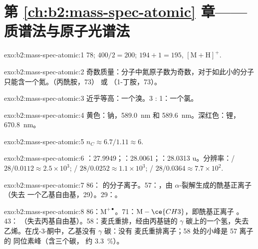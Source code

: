 \section*{第 \ref{ch:b2:mass-spec-atomic} 章——质谱法与原子光谱法}

\begin{solution}{exo:b2:mass-spec-atomic:1}
78; $400/2 = 200$; $194 + 1 = 195$, $[\mathrm M + \mathrm H]^+$.
\end{solution}

\begin{solution}{exo:b2:mass-spec-atomic:2}
奇数质量：分子中氮原子数为奇数，对于如此小的分子只能含一个氮。（丙酰胺，73）
或 （1-丁胺，73）。
\end{solution}

\begin{solution}{exo:b2:mass-spec-atomic:3}
近乎等高：一个溴。3 : 1：一个氯。
\end{solution}

\begin{solution}{exo:b2:mass-spec-atomic:4}
黄色：钠，\qty{589.0}{nm} 和 \qty{589.6}{nm}。深红色：锂，\qty{670.8}{nm}。
\end{solution}

\begin{solution}{exo:b2:mass-spec-atomic:5}
$n_C \approx 6.7/1.11 \approx 6$.
\end{solution}

\begin{solution}{exo:b2:mass-spec-atomic:6}
：27.9949；：28.0061；：28.0313 u。分辨率：/ $28/0.0112
\approx 2.5 \times 10^3$; / $28/0.0252 \approx 1.1 \times 10^3$; /
$28/0.0364 \approx 7.7 \times 10^2$.
\end{solution}

\begin{solution}{exo:b2:mass-spec-atomic:7}
86： 的分子离子。57：，由 $\alpha$-裂解生成的酰基正离子（失去
一个乙基自由基，29）。29：。
\end{solution}

\begin{solution}{exo:b2:mass-spec-atomic:8}
86：$\mathrm M^{+\bullet}$。71：$\mathrm M - \ce{CH3}$，即酰基正离子 。43：
（失去丙基自由基）。58：麦氏重排，经由丙基链的
$\gamma$ 碳上的一个氢，失去乙烯。在戊-3-酮中，乙基没有 $\gamma$ 碳：没有
麦氏重排离子；58 处的小峰是 57 离子的  同位素峰（含三个碳，
约 3.3~\%）。
\end{solution}

